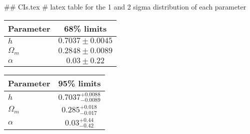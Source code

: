 ## CIs.tex
# latex table for the 1 and 2 sigma distribution of each parameter

\begin{tabular} { l  c}
 Parameter &  68\% limits\\
\hline
{\boldmath$h              $} & $0.7037\pm 0.0045          $\\
{\boldmath$\Omega_m       $} & $0.2848\pm 0.0089          $\\
{\boldmath$\alpha         $} & $0.03\pm 0.22              $\\
\hline
\end{tabular}

\begin{tabular} { l  c}
 Parameter &  95\% limits\\
\hline
{\boldmath$h              $} & $0.7037^{+0.0088}_{-0.0089}$\\
{\boldmath$\Omega_m       $} & $0.285^{+0.018}_{-0.017}   $\\
{\boldmath$\alpha         $} & $0.03^{+0.44}_{-0.42}      $\\
\hline
\end{tabular}
